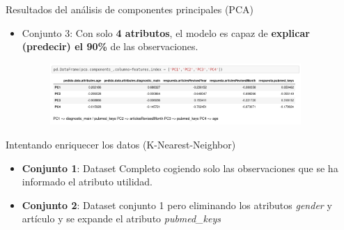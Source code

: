 \documentclass[10pt]{beamer}
\begin{document}
\begin{frame}{Resultados del análisis de componentes principales (PCA)}
  \begin{itemize}
  	\item Conjunto 3: Con solo \textbf{4 atributos}, el modelo es capaz de \textbf{explicar (predecir) el 90\%} de las observaciones.
    \begin{figure}[!htb]
      \centering
      \includegraphics[width=0.9\textwidth]{images/resultados_procesado_de_datos_pca3_atributos.png}
    \end{figure}
  \end{itemize}	
\end{frame}

\begin{frame}{Intentando enriquecer los datos (K-Nearest-Neighbor)}
  \begin{itemize}
  	\item \textbf{Conjunto 1}: Dataset Completo cogiendo solo las observaciones que se ha informado el atributo utilidad.
  	\item \textbf{Conjunto 2}: Dataset conjunto 1 pero eliminando los atributos \textit{gender} y artículo y se expande el atributo \textit{pubmed\_keys}
  \end{itemize}
\end{frame}
\end{document}
